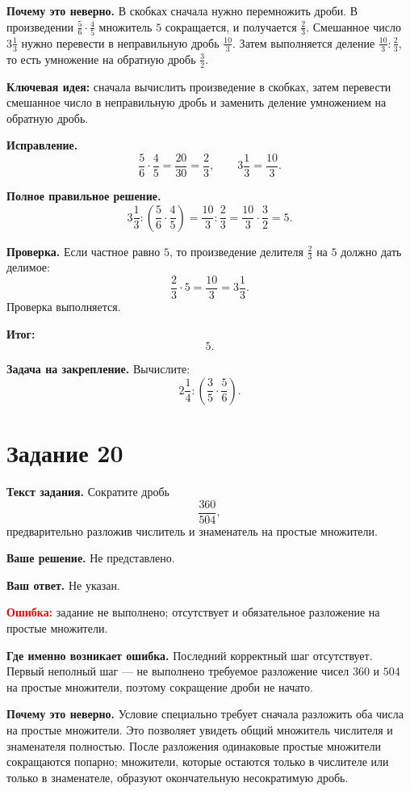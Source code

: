 \documentclass[12pt,a4paper]{article}
\begin{document}
\textbf{Почему это неверно.}
В скобках сначала нужно перемножить дроби. В произведении $\frac56\cdot\frac45$ множитель $5$ сокращается, и получается $\frac23$. Смешанное число $3\frac13$ нужно перевести в неправильную дробь $\frac{10}{3}$. Затем выполняется деление $\frac{10}{3}:\frac23$, то есть умножение на обратную дробь $\frac32$.

\textcolor{blue!60!black}{\textbf{Ключевая идея:}} сначала вычислить произведение в скобках, затем перевести смешанное число в неправильную дробь и заменить деление умножением на обратную дробь.

\textbf{Исправление.}
\[
\frac56\cdot\frac45=\frac{20}{30}=\frac23,
\qquad
3\frac13=\frac{10}{3}.
\]

\textbf{Полное правильное решение.}
\[
3\frac13:\left(\frac56\cdot\frac45\right)
=\frac{10}{3}:\frac23
=\frac{10}{3}\cdot\frac32
=5.
\]

\textbf{Проверка.}
Если частное равно $5$, то произведение делителя $\frac23$ на $5$ должно дать делимое:
\[
\frac23\cdot5=\frac{10}{3}=3\frac13.
\]
Проверка выполняется.

\textcolor{teal!60!black}{\textbf{Итог:}}
\[
\boxed{5}.
\]

\textbf{Задача на закрепление.}
Вычислите:
\[
2\frac14:\left(\frac35\cdot\frac56\right).
\]

\newpage
{}\label{task:20}
\section*{Задание 20}

\textbf{Текст задания.}
Сократите дробь
\[
\frac{360}{504},
\]
предварительно разложив числитель и знаменатель на простые множители.

\textbf{Ваше решение.}
Не представлено.

\textbf{Ваш ответ.}
Не указан.

\textcolor{red}{\textbf{Ошибка:}} задание не выполнено; отсутствует и обязательное разложение на простые множители.

\textbf{Где именно возникает ошибка.}
Последний корректный шаг отсутствует. Первый неполный шаг --- не выполнено требуемое разложение чисел $360$ и $504$ на простые множители, поэтому сокращение дроби не начато.

\textbf{Почему это неверно.}
Условие специально требует сначала разложить оба числа на простые множители. Это позволяет увидеть общий множитель числителя и знаменателя полностью. После разложения одинаковые простые множители сокращаются попарно; множители, которые остаются только в числителе или только в знаменателе, образуют окончательную несократимую дробь.
\end{document}
